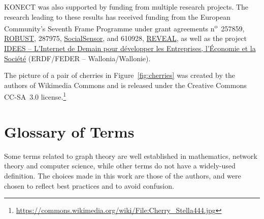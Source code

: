 \documentclass{article}
\begin{document}
KONECT was also supported by funding from multiple research projects. 
The research leading to
these results has received funding from the European Community's Seventh
Frame Programme under grant agreements n\textsuperscript{o}~257859,
\href{http://robust-project.eu/}{ROBUST}, 287975,
\href{http://www.socialsensor.eu/}{SocialSensor}, and 610928,
\href{http://revealproject.eu/}{REVEAL}, as well as the project
\href{http://nouvelles.unamur.be/upnews.2015-10-01.8995593781}{IDEES --
  L'Internet de Demain pour développer les Entreprises, l'Économie et la
  Société} (ERDF/FEDER -- Wallonia/Wallonie). 

The picture of a pair of cherries in Figure~\ref{fig:cherries} was
created by the authors of Wikimedia Commons and is released under the
Creative Commons CC-SA~3.0 license.\footnote{\url{https://commons.wikimedia.org/wiki/File:Cherry_Stella444.jpg}}

\let\oldbibliography\thebibliography
\renewcommand{\thebibliography}[1]{%
  \oldbibliography{#1}%
  \setlength{\itemsep}{0pt}%
}



\appendix

\section{Glossary of Terms}
Some terms related to graph theory are well established in mathematics,
network theory and computer science, while other terms do not have a
widely-used definition.  
The choices made in this work are those of the authors, and were chosen
to reflect best practices and to avoid confusion.
\end{document}
